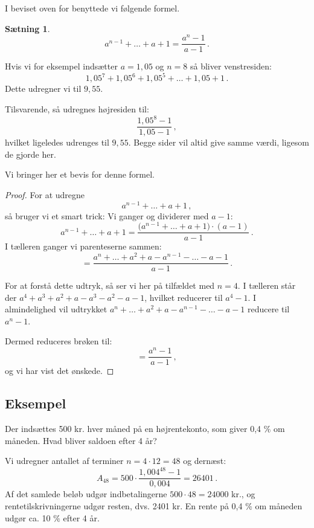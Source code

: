 \documentclass[12pt,oneside,a4paper]{article}
\newtheorem{thm}{Sætning}[section]
\begin{document}
I beviset oven for benyttede vi følgende formel.

\begin{tcolorbox}
\begin{thm}
\[
    a^{n-1} + \ldots + a + 1 = \frac{a^{n} - 1}{a-1} \,.
\]
\end{thm}
\end{tcolorbox}

Hvis vi for eksempel indsætter $a = 1,05$ og $n = 8$ så bliver venstresiden:
\[
    1,05^7 + 1,05^6 + 1,05^5 + \ldots + 1,05 + 1 \,.
\]
Dette udregner vi til $9,55$.

Tilsvarende, så udregnes højresiden til:
\[
    \frac{1,05^8-1}{1,05-1} \,,
\]
hvilket ligeledes udrenges til $9,55$. Begge sider vil altid give samme værdi,
ligesom de gjorde her.

Vi bringer her et bevis for denne formel.

\begin{tcolorbox}
\begin{proof}
For at udregne
\[
    a^{n-1} + \ldots + a + 1 \,,
\]
så bruger vi et smart trick: Vi ganger og dividerer med $a-1$:
\[
    a^{n-1} + \ldots + a + 1  = 
\frac{\big(a^{n-1} + \ldots + a + 1\big)\cdot(a-1)}{a-1} \,.
\]
I tælleren ganger vi parenteserne sammen:
\[
 = \frac{a^{n} + \ldots + a^2 + a - a^{n-1} - \ldots - a - 1}{a-1} \,.
\]

For at forstå dette udtryk, så ser vi her på tilfældet med $n=4$. I tælleren
står der $a^4 + a^3 + a^2 + a - a^3 - a^2 - a - 1$, hvilket reducerer til $a^4 - 1$.
I almindelighed vil udtrykket $a^{n} + \ldots + a^2 + a - a^{n-1} - \ldots - a - 1$ 
reducere til $a^n - 1$.

Dermed reduceres brøken til:
\[
 = \frac{a^{n} - 1}{a-1} \,,
\]
og vi har vist det ønskede.

\end{proof}
\end{tcolorbox}

\begin{tcolorbox}
\subsection*{Eksempel}
Der indsættes 500 kr. hver måned på en højrentekonto, som giver
0,4 $\%$ om måneden. Hvad bliver saldoen efter 4 år?

Vi udregner antallet af terminer $n=4\cdot12 = 48$ og dernæst:
\[
A_{48} = 500\cdot\frac{1,004^{48}-1}{0,004} = 26401 \,.
\]
Af det samlede beløb udgør indbetalingerne $500\cdot 48 = 24000$ kr., og
rentetilskrivningerne udgør resten, dvs. 2401 kr. En rente på 0,4 $\%$
om måneden udgør ca. 10 $\%$ efter 4 år.

\end{tcolorbox}
\end{document}
